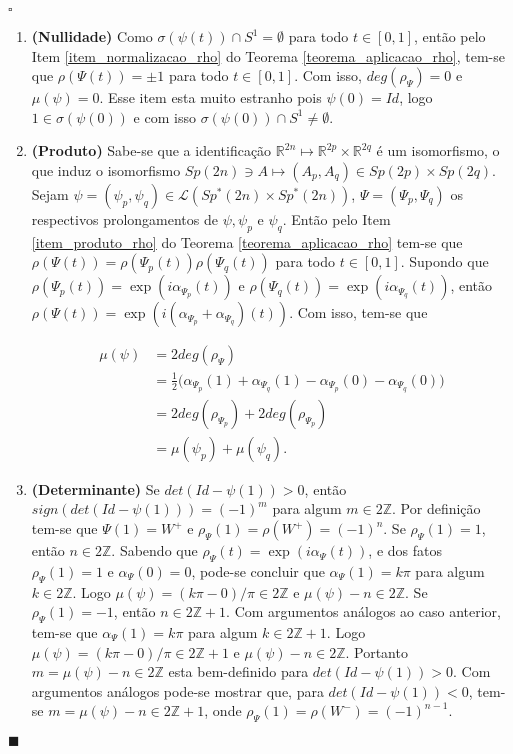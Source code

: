 \documentclass[12pt]{book}
\newenvironment{prova}[1]{$\square$ #1}{\hfill$\blacksquare$}
\newcommand{\caminhos}{\mathcal{L}}
\newcommand{\circulo}{S^{1}}
\newcommand{\espectrooperador}[1]{\sigma(#1)}
\newcommand{\gruposimpletico}[1]{Sp(#1)}
\newcommand{\gruposimpleticonaodegenerado}[1]{Sp^{#1}(2n)}
\newcommand{\inteiros}{\mathbb{Z}}
\newcommand{\intervalo}{[0,1]}
\newcommand{\real}[1]{\mathbb{R}^{#1}}
\newcommand{\vermelho}[1]{{\color{red}#1}}
\begin{document}
\begin{prova}
\begin{enumerate}
			\item \textbf{(Nullidade)} Como  $\espectrooperador{\psi(t)}\cap \circulo = \emptyset$ para todo $t\in \intervalo$, então pelo Item \ref{item_normalizacao_rho} do Teorema \ref{teorema_aplicacao_rho}, tem-se que $\rho(\Psi(t)) = \pm 1$ para todo $t\in \intervalo$. Com isso, $deg(\rho_{\Psi}) = 0$ e $\mu(\psi) = 0$. \vermelho{Esse item esta muito estranho pois $\psi(0) = Id$, logo $1 \in \espectrooperador{\psi(0)}$ e com isso $\espectrooperador{\psi(0)}\cap \circulo \neq \emptyset$.}
			
			\item \textbf{(Produto)} Sabe-se que a identificação $\real{2n} \mapsto \real{2p}\times \real{2q}$ é um isomorfismo, o que induz o isomorfismo $\gruposimpletico{2n} \ni A \mapsto (A_{p}, A_{q}) \in \gruposimpletico{2p} \times \gruposimpletico{2q}$. Sejam $\psi=(\psi_{p}, \psi_{q}) \in \caminhos{(\gruposimpleticonaodegenerado{*}\times \gruposimpleticonaodegenerado{*})}$, $\Psi=(\Psi_{p}, \Psi_{q})$ os respectivos prolongamentos de $\psi, \psi_{p}$ e $\psi_{q}$. Então pelo Item \ref{item_produto_rho} do Teorema \ref{teorema_aplicacao_rho} tem-se que $\rho(\Psi(t))=\rho(\Psi_{p}(t))\rho(\Psi_{q}(t))$ para todo $t\in \intervalo$. Supondo que $\rho(\Psi_{p}(t))=\exp(i\alpha_{\Psi_{p}}(t))$ e $\rho(\Psi_{q}(t))=\exp(i\alpha_{\Psi_{q}}(t))$, então $\rho(\Psi(t)) = \exp(i(\alpha_{\Psi_{p}}+\alpha_{\Psi_{q}})(t))$. Com isso, tem-se que 
			
			$$
			\begin{aligned}
			\mu(\psi) &= 2deg(\rho_{\Psi}) 
			\\
			&= \frac{1}{2}\big(\alpha_{\Psi_{p}}(1)+\alpha_{\Psi_{q}}(1) -\alpha_{\Psi_{p}}(0)-\alpha_{\Psi_{q}}(0) \big) 
			\\
			&= 2deg(\rho_{\Psi_{p}}) +2deg(\rho_{\Psi_{p}}) 
			\\
			&=\mu(\psi_{p})+\mu(\psi_{q}).
			\end{aligned}
			$$
			
			\item \textbf{(Determinante)} Se $det(Id-\psi(1) )>0$, então $sign(det(Id-\psi(1) )) = (-1)^{m}$ para algum $m\in 2\inteiros$. Por definição tem-se que $\Psi(1)=W^{+}$ e $\rho_{\Psi}(1) = \rho(W^{+}) = (-1)^{n}$. Se $\rho_{\Psi}(1) =1$, então $n\in 2\inteiros$. Sabendo que $\rho_{\Psi}(t) = \exp(i\alpha_{\Psi}(t))$, e dos fatos $\rho_{\Psi}(1) = 1$ e $\alpha_{\Psi}(0) = 0$, pode-se concluir que $\alpha_{\Psi}(1)=k\pi$ para algum $k \in 2\inteiros$. Logo $\mu(\psi) = (k\pi-0)/\pi \in 2\inteiros$ e $\mu(\psi)-n \in 2\inteiros$. Se $\rho_{\Psi}(1) =-1$, então $n\in 2\inteiros+1$. Com argumentos análogos ao caso anterior, tem-se que $\alpha_{\Psi}(1) = k\pi$ para algum $k\in 2\inteiros+1$. Logo $\mu(\psi) = (k\pi-0)/\pi \in 2\inteiros+1$ e $\mu(\psi)-n \in 2\inteiros$. Portanto $m = \mu(\psi)-n \in 2\inteiros$ esta bem-definido para $det(Id-\psi(1) )>0$. Com argumentos análogos pode-se mostrar que, para $det(Id-\psi(1) )<0$, tem-se $m = \mu(\psi)-n \in 2\inteiros+1$, onde $\rho_{\Psi}(1) = \rho(W^{-}) = (-1)^{n-1}$.
			

\end{enumerate}
\end{prova}
\end{document}

